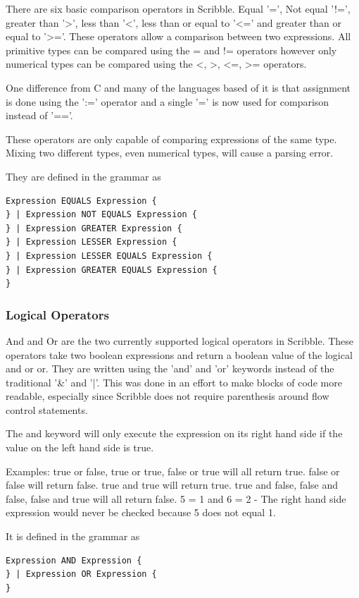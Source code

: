 \documentclass[]{final_report}
\begin{document}
There are six basic comparison operators in Scribble. Equal '=', Not equal '!=', greater than '>', less than '<', less than or equal to '<=' and greater than or equal to '>='. These operators allow a comparison between two expressions. All primitive types can be compared using the = and != operators however only numerical types can be compared using the <, >, <=, >= operators.

One difference from C and many of the languages based of it is that assignment is done using the ':=' operator and a single '=' is now used for comparison instead of '=='.

These operators are only capable of comparing expressions of the same type. Mixing two different types, even numerical types, will cause a parsing error.

They are defined in the grammar as \begin{verbatim}
Expression EQUALS Expression {
} | Expression NOT EQUALS Expression {
} | Expression GREATER Expression {
} | Expression LESSER Expression {
} | Expression LESSER EQUALS Expression {
} | Expression GREATER EQUALS Expression {
}
\end{verbatim}

\subsubsection{Logical Operators}

And and Or are the two currently supported logical operators in Scribble. These operators take two boolean expressions and return a boolean value of the logical and or or. They are written using the 'and' and 'or' keywords instead of the traditional '\&' and '|'. This was done in an effort to make blocks of code more readable, especially since Scribble does not require parenthesis around flow control statements.

The and keyword will only execute the expression on its right hand side if the value on the left hand side is true.

Examples:
true or false, true or true, false or true will all return true.
false or false will return false.
true and true will return true.
true and false, false and false, false and true will all return false.
5 = 1 and 6 = 2 - The right hand side expression would never be checked because 5 does not equal 1.

It is defined in the grammar as
\begin{verbatim}
Expression AND Expression {
} | Expression OR Expression {
}
\end{verbatim}
\end{document}
